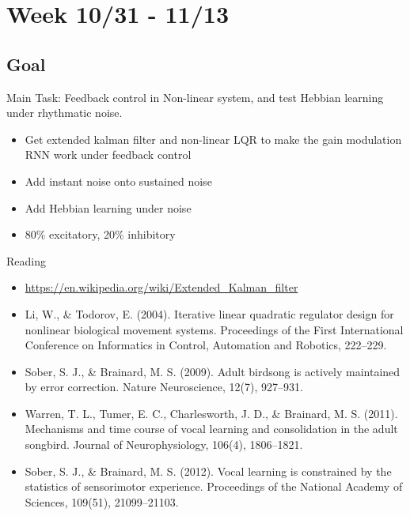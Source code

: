 \documentclass[12pt, a4paper]{article}
\begin{document}
\newpage


\section*{Week 10/31 - 11/13}

\subsection*{Goal}

\noindent
Main Task: Feedback control in Non-linear system, and test Hebbian learning under rhythmatic noise.

\begin{itemize}
    \item Get extended kalman filter and non-linear LQR to make the gain modulation RNN work under feedback control
    \item Add instant noise onto sustained noise
    \item Add Hebbian learning under noise
    \item 80\% excitatory, 20\% inhibitory
\end{itemize}

\noindent
Reading

\begin{itemize}
    \item \url{https://en.wikipedia.org/wiki/Extended_Kalman_filter}
    \item Li, W., \& Todorov, E. (2004). Iterative linear quadratic regulator design for nonlinear biological movement systems. Proceedings of the First International Conference on Informatics in Control, Automation and Robotics, 222–229.
    \item Sober, S. J., \& Brainard, M. S. (2009). Adult birdsong is actively maintained by error correction. Nature Neuroscience, 12(7), 927–931.
    \item Warren, T. L., Tumer, E. C., Charlesworth, J. D., \& Brainard, M. S. (2011). Mechanisms and time course of vocal learning and consolidation in the adult songbird. Journal of Neurophysiology, 106(4), 1806–1821.
    \item Sober, S. J., \& Brainard, M. S. (2012). Vocal learning is constrained by the statistics of sensorimotor experience. Proceedings of the National Academy of Sciences, 109(51), 21099–21103.
\end{itemize}

\newpage
\end{document}
